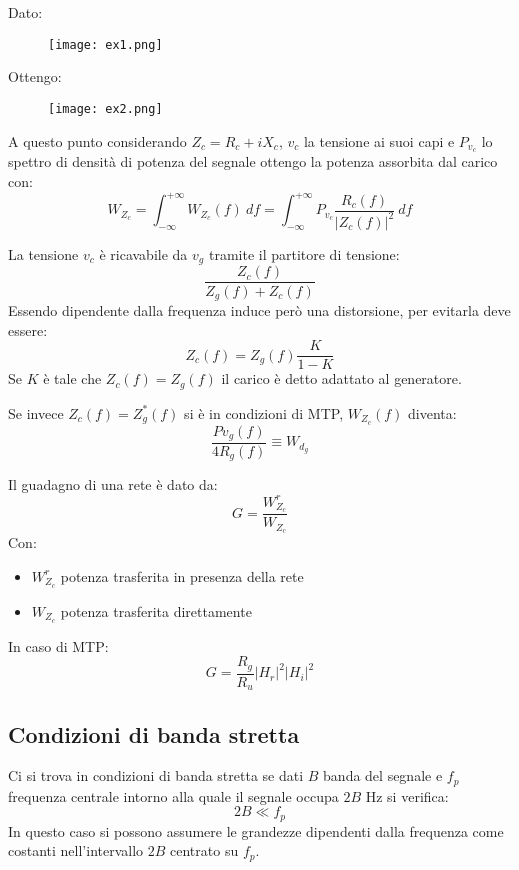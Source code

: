 \documentclass{article}
\begin{document}
\newpage

\noindent Dato:

\begin{figure}[ht]
    \centering
    \texttt{[image: ex1.png]}
\end{figure}

\noindent Ottengo:

\begin{figure}[ht]
    \centering
    \texttt{[image: ex2.png]}
\end{figure}

\vspace{5pt}

\noindent A questo punto considerando $Z_c=R_c+iX_c$, $v_c$ la tensione ai suoi capi e $P_{v_c}$ lo spettro di densità di potenza del segnale ottengo la potenza assorbita dal carico con:
$$W_{Z_c}=\int_{-\infty}^{+\infty}W_{Z_c}(f)\ df=\int_{-\infty}^{+\infty}P_{v_c}\frac{R_c(f)}{|Z_c(f)|^2}\ df$$\newline

\noindent La tensione $v_c$ è ricavabile da $v_g$ tramite il partitore di tensione:
$$\frac{Z_c(f)}{Z_g(f)+Z_c(f)}$$
\noindent Essendo dipendente dalla frequenza induce però una distorsione, per evitarla deve essere:
$$Z_c(f)=Z_g(f)\frac{K}{1-K}$$
\noindent Se $K$ è tale che $Z_c(f)=Z_g(f)$ il carico è detto adattato al generatore.

\noindent Se invece $Z_c(f)=Z_g^*(f)$ si è in condizioni di MTP, $W_{Z_c}(f)$ diventa:
$$\frac{P{v_g}(f)}{4R_g(f)}\equiv W_{d_g}$$\newline

\noindent Il guadagno di una rete è dato da:
$$G=\frac{W_{Z_c}^r}{W_{Z_c}}$$
\noindent Con:
\begin{itemize}
    \item $W_{Z_c}^r$ potenza trasferita in presenza della rete
    \item $W_{Z_c}$ potenza trasferita direttamente\newline
\end{itemize}

\noindent In caso di MTP:
$$G=\frac{R_g}{R_u}|H_r|^2|H_i|^2$$\newline

\subsection{Condizioni di banda stretta}

Ci si trova in condizioni di banda stretta se dati $B$ banda del segnale e $f_p$ frequenza centrale intorno alla quale il segnale occupa $2B$ Hz si verifica:
$$2B\ll f_p$$
\noindent In questo caso si possono assumere le grandezze dipendenti dalla frequenza come costanti nell'intervallo $2B$ centrato su $f_p$.\newline
\end{document}
